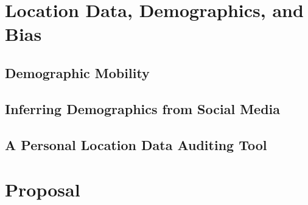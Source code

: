\documentclass[12pt]{report}
\begin{document}
\chapter{Location Data, Demographics, and Bias}
\label{chap:bias}
  \section{Demographic Mobility}
  \label{sec:bias}
  

  \section{Inferring Demographics from Social Media}
  \label{sec:demo}
  

  \section{A Personal Location Data Auditing Tool}
  \label{sec:findyou}
  

\chapter{Proposal}
\label{chap:proposal}
\label{sec:proposal-i}



% 


% 


\pagebreak

\begin{footnotesize}

% 

\end{footnotesize}
\end{document}
